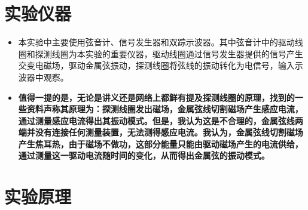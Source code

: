 \documentclass[11pt]{article}
\begin{document}
\section{实验仪器}

\begin{itemize}
	\item 本实验中主要使用弦音计、信号发生器和双踪示波器。其中弦音计中的驱动线圈和探测线圈为本实验的重要仪器，驱动线圈通过信号发生器提供的信号产生交变电磁场，驱动金属弦振动，探测线圈将弦线的振动转化为电信号，输入示波器中观察。
	\item \textbf{值得一提的是，无论是讲义还是网络上都鲜有提及探测线圈的原理，找到的一些资料声称其原理为：探测线圈发出磁场，金属弦线切割磁场产生感应电流，通过测量感应电流得出其振动模式。但是，我认为这是不合理的，金属弦线两端并没有连接任何测量装置，无法测得感应电流。我认为，金属弦线切割磁场产生焦耳热，由于磁场不做功，这部分能量只能由驱动磁场产生的电流供给，通过测量这一驱动电流随时间的变化，从而得出金属弦的振动模式。}
\end{itemize}
\section{实验原理}
\end{document}
